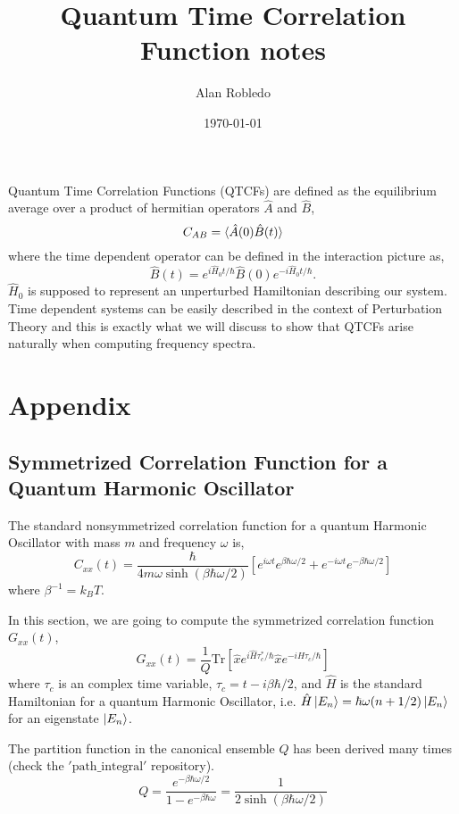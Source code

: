 \documentclass{article}
\title{Quantum Time Correlation Function notes}
\date{\today}
\author{Alan Robledo}
\newcommand{\be}{\begin{equation*}}
\newcommand{\ee}{\end{equation*}}
\begin{document}
\maketitle
Quantum Time Correlation Functions (QTCFs) are defined as the equilibrium average over a product of hermitian operators $\hat{A}$ and $\hat{B}$,
\be
  C_{AB} = \braket{\hat{A}(0) \hat{B}(t)}
\ee
where the time dependent operator can be defined in the interaction picture as,
\be
  \hat{B}(t) = e^{i \hat{H}_0 t/ \hbar} \hat{B}(0) e^{-i \hat{H}_0 t/ \hbar} .
\ee
$\hat{H}_0$ is supposed to represent an unperturbed Hamiltonian describing our system. Time dependent systems can be easily described in the context of Perturbation Theory and this is exactly what we will discuss to show that QTCFs arise naturally when computing frequency spectra.


\section{Appendix}
\subsection{Symmetrized Correlation Function for a Quantum Harmonic Oscillator}
The standard nonsymmetrized correlation function for a quantum Harmonic Oscillator with mass $m$ and frequency $\omega$ is,
\be
  C_{xx}(t) = \frac{\hbar}{4 m \omega \sinh(\beta \hbar \omega/2)} \left[ e^{i \omega t} e^{\beta \hbar \omega/2} + e^{-i \omega t} e^{-\beta \hbar \omega/2} \right]
\ee
where $\beta^{-1} = k_B T$.

In this section, we are going to compute the symmetrized correlation function $G_{xx}(t)$,
\be
  G_{xx}(t) = \frac{1}{Q} \text{Tr} \left[ \hat{x} e^{i \hat{H} \tau^*_c / \hbar} \hat{x} e^{-i \hat{H} \tau_c / \hbar}\right]
\ee
where $\tau_c$ is an complex time variable, $\tau_c = t - i\beta \hbar/2$, and $\hat{H}$ is the standard Hamiltonian for a quantum Harmonic Oscillator, i.e. $\hat{H} \ket{E_n} = \hbar \omega(n+1/2) \ket{E_n}$ for an eigenstate $\ket{E_n}$.

The partition function in the canonical ensemble $Q$ has been derived many times (check the $'\text{path}\_\text{integral}'$ repository).
\be
  Q = \frac{e^{-\beta \hbar \omega/2}}{1-e^{-\beta \hbar \omega}} = \frac{1}{2 \sinh(\beta \hbar \omega /2)}
\ee
\end{document}
